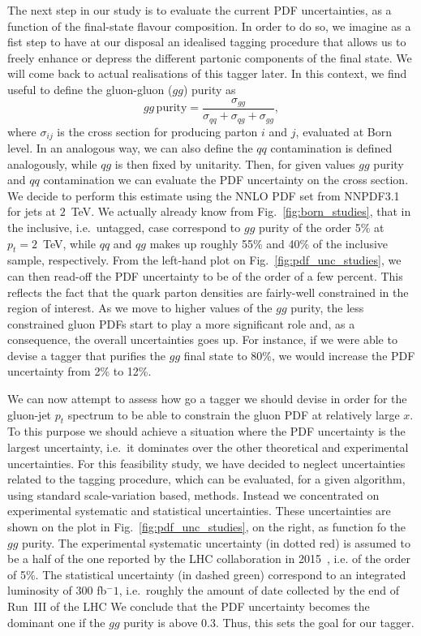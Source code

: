 The next step in our study is to evaluate the current PDF uncertainties, as a function of the final-state flavour composition. 
%
In order to do so, we imagine as a fist step to have at our disposal an idealised tagging procedure that allows us to freely enhance or depress the different partonic components of the final state. We will come back to actual realisations of this tagger later. 
%
In this context, we find useful to define the gluon-gluon ($gg$) purity as
\begin{equation}\label{gg-purity}
gg \, \text{purity}= \frac{\sigma_{gg}}{\sigma_{qq}+\sigma_{qg}+\sigma_{gg}},
\end{equation}
where $\sigma_{ij}$ is the cross section for producing parton $i$ and $j$, evaluated at Born level.  In an analogous way, we can also define the $q q$ contamination is defined analogously, while $q g$ is then fixed by unitarity. Then, for given values $gg$ purity and $qq$ contamination we can evaluate the PDF uncertainty on the cross section.
%
 We decide to perform this estimate using the NNLO PDF set from NNPDF3.1~\cite{Ball:2017nwa} for jets at $2$~TeV.
%
We actually already know from Fig.~\ref{fig:born_studies}, that in the inclusive, i.e.\ untagged, case correspond to $gg$ purity of the order 5\% at $p_t=2$~TeV, while $qq$ and $qg$ makes up roughly 55\% and 40\% of the inclusive sample, respectively. 
%
From the left-hand plot on Fig.~\ref{fig:pdf_unc_studies}, we can then read-off the PDF uncertainty to be of the order of a few percent. This reflects the fact that the quark parton densities are fairly-well constrained in the region of interest. 
As we move to higher values of the $gg$ purity, the less constrained gluon PDFs start to play a more significant role and, as a consequence, the overall uncertainties goes up. For instance, if we were able to devise a tagger that purifies the $gg$ final state to 80\%, we would increase the PDF uncertainty from 2\% to 12\%. 

We can now attempt to assess how go a tagger we should devise in order for the gluon-jet $p_t$ spectrum to be able to constrain the gluon PDF at relatively large $x$. To this purpose we should achieve a situation where the PDF uncertainty is the largest uncertainty, i.e.\ it dominates over the other theoretical and experimental uncertainties. For this feasibility study, we have decided to neglect uncertainties related to the tagging procedure, which can be evaluated, for a given algorithm, using standard scale-variation based, methods. Instead we concentrated on experimental systematic and statistical uncertainties. These uncertainties are shown on the plot in Fig.~\ref{fig:pdf_unc_studies}, on the right, as function fo the $gg$ purity. The experimental systematic uncertainty (in dotted red)  is assumed to be a half of the one reported by the LHC collaboration in 2015~\cite{}, i.e. of the order of 5\%. The statistical uncertainty (in dashed green) correspond to an integrated luminosity of 300 fb$^-1$, i.e.\ roughly the amount of date collected by the end of Run~III of the LHC  
%
We conclude that the PDF uncertainty becomes the dominant one if the $gg$ purity is above 0.3. Thus, this sets the goal for our tagger.

